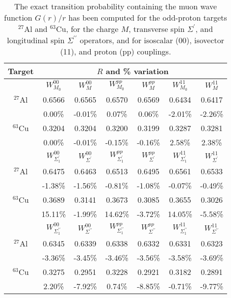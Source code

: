 \documentclass[12pt,letterpaper]{book}
\begin{document}
\begin{table}
\centering
 \begin{tabular}{ccccccc}
 \hline
 \hline
Target &  \multicolumn{5}{c}{~~~~~~~$R$ and \% variation}  & \\
\hline
 & $W_{M_0}^{00}$ & $W_M^{00}$ & $W_{M_0}^{pp}$ & $W_M^{pp}$ & $W_{M_0}^{11}$ & $W_M^{11}$ \\
 $^{27}$Al & 0.6566 & 0.6565 & 0.6570 & 0.6569  & 0.6434 & 0.6417  \\
  & 0.00\% & -0.01\% & 0.07\% & 0.06\% &  -2.01\% & -2.26\% \\
  $^{63}$Cu & 0.3204 & 0.3204 & 0.3200 & 0.3199 & 0.3287 & 0.3281  \\
  & 0.00\% & -0.01\% & -0.15\% & -0.16\%   & 2.58\% & 2.38\% \\[3mm]
 & $W_{\Sigma^\prime_1}^{00}$ & $W_{\Sigma^\prime}^{00}$ & $W_{\Sigma^\prime_1}^{pp}$ & $W_{\Sigma^\prime}^{pp}$ &  $W_{\Sigma^\prime_1}^{11}$ & $W_{\Sigma^\prime}^{11}$ \\
 $^{27}$Al & 0.6475 & 0.6463 & 0.6513 & 0.6495 & 0.6561 & 0.6533 \\
  & -1.38\% & -1.56\% & -0.81\% & -1.08\% &  -0.07\% & -0.49\% \\
  $^{63}$Cu & 0.3689 & 0.3141 & 0.3673 & 0.3085 &  0.3655 &  0.3026 \\
  & 15.11\% & -1.99\% & 14.62\% & -3.72\% & 14.05\% &  -5.58\% \\[3mm]
  & $W_{\Sigma^{\prime \prime}_1}^{00}$ & $W_{\Sigma^{\prime \prime}}^{00}$ & $W_{\Sigma^{\prime \prime}_1}^{pp}$ & $W_{\Sigma^{\prime \prime}}^{pp}$ & $W_{\Sigma^{\prime \prime}_1}^{11}$ & $W_{\Sigma^{\prime \prime}}^{11}$ \\
 $^{27}$Al & 0.6345 & 0.6339 & 0.6338 & 0.6332 &  0.6331 &  0.6323 \\
  & -3.36\% & -3.45\% & -3.46\% & -3.56\% & -3.58\% & -3.69\% \\
  $^{63}$Cu & 0.3275 & 0.2951 & 0.3228 & 0.2921 & 0.3182 & 0.2891  \\
  & 2.20\% & -7.92\% & 0.74\% & -8.85\% & -0.71\% & -9.77\% \\
  \hline
  \hline
 \end{tabular}
  \caption{ \label{tab:average1} The exact transition probability containing the muon wave function $G(r)/r$ has been computed for the odd-proton targets $^{27}$Al and $^{63}$Cu, for the charge $M$,
  transverse spin $\Sigma^\prime$, and longitudinal spin $\Sigma^{\prime \prime}$ operators, and for isoscalar (00), isovector (11), and proton (pp) couplings.
}
\end{table}
\end{document}
